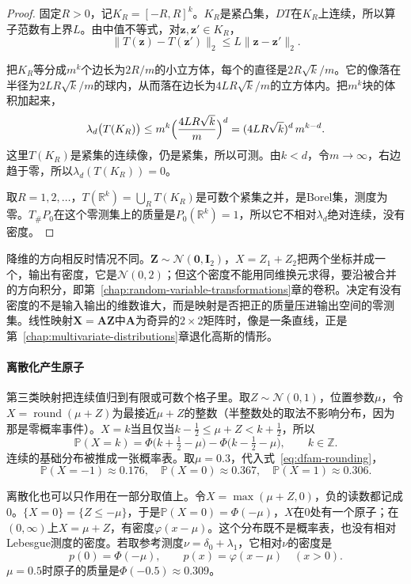 \begin{proof}
固定$R>0$，记$K_R=[-R,R]^{k}$。$K_R$是紧凸集，$DT$在$K_R$上连续，所以算子范数有上界$L$。由中值不等式，对$\bm{z},\bm{z}'\in K_R$，
\[
  \lVert T(\bm{z})-T(\bm{z}')\rVert_2\leq L\lVert\bm{z}-\bm{z}'\rVert_2 .
\]

把$K_R$等分成$m^{k}$个边长为$2R/m$的小立方体，每个的直径是$2R\sqrt{k}/m$。它的像落在半径为$2LR\sqrt{k}/m$的球内，从而落在边长为$4LR\sqrt{k}/m$的立方体内。把$m^{k}$块的体积加起来，
\[
  \lambda_d\bigl(T(K_R)\bigr)\leq m^{k}\Bigl(\frac{4LR\sqrt{k}}{m}\Bigr)^{d}=(4LR\sqrt{k})^{d}\,m^{k-d} .
\]
这里$T(K_R)$是紧集的连续像，仍是紧集，所以可测。由$k<d$，令$m\to\infty$，右边趋于零，所以$\lambda_d(T(K_R))=0$。

取$R=1,2,\dots$，$T(\mathbb{R}^{k})=\bigcup_RT(K_R)$是可数个紧集之并，是Borel集，测度为零。$T_\#P_0$在这个零测集上的质量是$P_0(\mathbb{R}^{k})=1$，所以它不相对$\lambda_d$绝对连续，没有密度。
\end{proof}

降维的方向相反时情况不同。$\bm{Z}\sim\mathcal{N}(\bm{0},\bm{I}_2)$，$X=Z_1+Z_2$把两个坐标并成一个，输出有密度，它是$\mathcal{N}(0,2)$；但这个密度不能用同维换元求得，要沿被合并的方向积分，即第~\ref{chap:random-variable-transformations}章的卷积。决定有没有密度的不是输入输出的维数谁大，而是映射是否把正的质量压进输出空间的零测集。线性映射$\bm{X}=\bm{A}\bm{Z}$中$\bm{A}$为奇异的$2\times2$矩阵时，像是一条直线，正是第~\ref{chap:multivariate-distributions}章退化高斯的情形。

\paragraph{离散化产生原子}
第三类映射把连续值归到有限或可数个格子里。取$Z\sim\mathcal{N}(0,1)$，位置参数$\mu$，令$X=\operatorname{round}(\mu+Z)$为最接近$\mu+Z$的整数（半整数处的取法不影响分布，因为那是零概率事件）。$X=k$当且仅当$k-\tfrac12\leq\mu+Z<k+\tfrac12$，所以
\begin{equation}
  \mathbb{P}(X=k)=\Phi\bigl(k+\tfrac12-\mu\bigr)-\Phi\bigl(k-\tfrac12-\mu\bigr),\qquad k\in\mathbb{Z}.
  \label{eq:dfam-rounding}
\end{equation}
连续的基础分布被推成一张概率表。取$\mu=0.3$，代入式~\eqref{eq:dfam-rounding}，
\[
  \mathbb{P}(X=-1)\approx0.176,\quad\mathbb{P}(X=0)\approx0.367,\quad\mathbb{P}(X=1)\approx0.306 .
\]

离散化也可以只作用在一部分取值上。令$X=\max(\mu+Z,0)$，负的读数都记成$0$。$\{X=0\}=\{Z\leq-\mu\}$，于是$\mathbb{P}(X=0)=\Phi(-\mu)$，$X$在$0$处有一个原子；在$(0,\infty)$上$X=\mu+Z$，有密度$\varphi(x-\mu)$。这个分布既不是概率表，也没有相对Lebesgue测度的密度。若取参考测度$\nu=\delta_0+\lambda_1$，它相对$\nu$的密度是
\[
  p(0)=\Phi(-\mu),\qquad p(x)=\varphi(x-\mu)\quad(x>0).
\]
$\mu=0.5$时原子的质量是$\Phi(-0.5)\approx0.309$。

